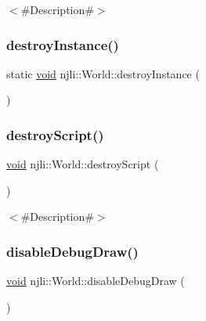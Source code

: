 $<$\#\+Description\#$>$ \mbox{\label{classnjli_1_1_world_a3bddccf6aeb57d953f358a2e66fc2c00}} 
\subsubsection{\texorpdfstring{destroy\+Instance()}{destroyInstance()}}
{\footnotesize\ttfamily static \mbox{\hyperlink{_thread_8h_af1e856da2e658414cb2456cb6f7ebc66}{void}} njli\+::\+World\+::destroy\+Instance (\begin{DoxyParamCaption}{ }\end{DoxyParamCaption})\hspace{0.3cm}{\ttfamily [static]}}

\mbox{\label{classnjli_1_1_world_ad27af4cf142639c3436f4163d0526442}} 
\subsubsection{\texorpdfstring{destroy\+Script()}{destroyScript()}}
{\footnotesize\ttfamily \mbox{\hyperlink{_thread_8h_af1e856da2e658414cb2456cb6f7ebc66}{void}} njli\+::\+World\+::destroy\+Script (\begin{DoxyParamCaption}{ }\end{DoxyParamCaption})}

$<$\#\+Description\#$>$ \mbox{\label{classnjli_1_1_world_a4894e4a53f692a503661a7836bf7713f}} 
\subsubsection{\texorpdfstring{disable\+Debug\+Draw()}{disableDebugDraw()}}
{\footnotesize\ttfamily \mbox{\hyperlink{_thread_8h_af1e856da2e658414cb2456cb6f7ebc66}{void}} njli\+::\+World\+::disable\+Debug\+Draw (\begin{DoxyParamCaption}{ }\end{DoxyParamCaption})}

